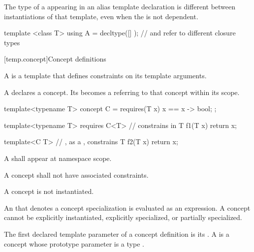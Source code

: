 \pnum
The type of a 
appearing in an alias template declaration
is different between instantiations of that template,
even when the  is not dependent.
\begin{example}
\begin{codeblock}
template <class T>
  using A = decltype([] { });   //  and  refer to different closure types
\end{codeblock}
\end{example}

[temp.concept]{Concept definitions}

\pnum
A  is a template
that defines constraints on its template arguments.

\pnum
A 
declares a concept.
Its  becomes a 
referring to that concept
within its scope.
\begin{example}
\begin{codeblock}
template<typename T>
concept C = requires(T x) {
  { x == x } -> bool;
};

template<typename T>
  requires C<T>     //  constrains  in 
T f1(T x) { return x; }

template<C T>       // , as a , constrains 
T f2(T x) { return x; }
\end{codeblock}
\end{example}

\pnum
A 
shall appear at namespace scope.

\pnum
A concept shall not have associated constraints.

\pnum
A concept is not instantiated.
\begin{note}
An  that denotes a concept specialization
is evaluated as an expression.
A concept cannot be
explicitly instantiated,
explicitly specialized,
or partially specialized.
\end{note}

\pnum
The first declared template parameter of a concept definition is its
.
%
A 
is a concept whose prototype parameter
is a type .

